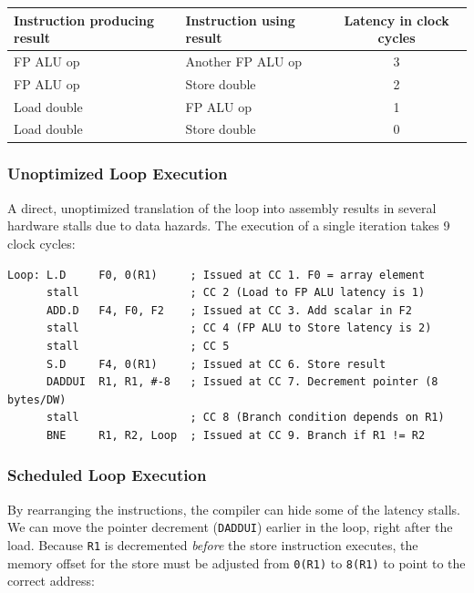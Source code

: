 \begin{table}[htpb]
    \centering
    \renewcommand{\arraystretch}{1.2}
    \begin{tabular}{l l c}
        \textbf{Instruction producing result} & \textbf{Instruction using result} & \textbf{Latency in clock cycles} \\
        \hline
        FP ALU op & Another FP ALU op & 3 \\
        FP ALU op & Store double & 2 \\
        Load double & FP ALU op & 1 \\
        Load double & Store double & 0 \\
        \hline
    \end{tabular}
\end{table}

\subsubsection*{Unoptimized Loop Execution}
A direct, unoptimized translation of the loop into assembly results in several hardware stalls due to data hazards. The execution of a single iteration takes 9 clock cycles:

\begin{lstlisting}[language={[x86masm]Assembler}]
Loop: L.D     F0, 0(R1)     ; Issued at CC 1. F0 = array element
      stall                 ; CC 2 (Load to FP ALU latency is 1)
      ADD.D   F4, F0, F2    ; Issued at CC 3. Add scalar in F2
      stall                 ; CC 4 (FP ALU to Store latency is 2)
      stall                 ; CC 5
      S.D     F4, 0(R1)     ; Issued at CC 6. Store result
      DADDUI  R1, R1, #-8   ; Issued at CC 7. Decrement pointer (8 bytes/DW)
      stall                 ; CC 8 (Branch condition depends on R1)
      BNE     R1, R2, Loop  ; Issued at CC 9. Branch if R1 != R2
\end{lstlisting}

\subsubsection*{Scheduled Loop Execution}
By rearranging the instructions, the compiler can hide some of the latency stalls. We can move the pointer decrement (\texttt{DADDUI}) earlier in the loop, right after the load. Because \texttt{R1} is decremented \textit{before} the store instruction executes, the memory offset for the store must be adjusted from \texttt{0(R1)} to \texttt{8(R1)} to point to the correct address:

